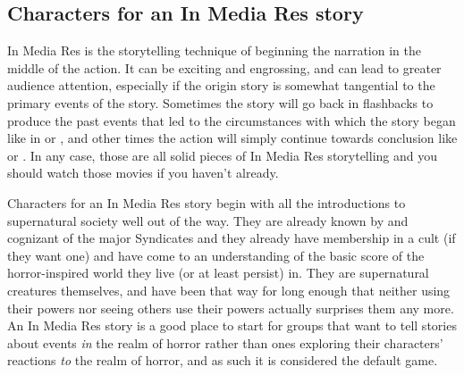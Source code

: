 \subsection[In Media Res]{Characters for an In Media Res story}

In Media Res is the storytelling technique of beginning the narration in the middle of the action. It can be exciting and engrossing, and can lead to greater audience attention, especially if the origin story is somewhat tangential to the primary events of the story. Sometimes the story will go back in flashbacks to produce the past events that led to the circumstances with which the story began like in  or , and other times the action will simply continue towards conclusion like  or . In any case, those are all solid pieces of In Media Res storytelling and you should watch those movies if you haven't already.

Characters for an In Media Res story begin with all the introductions to supernatural society well out of the way. They are already known by and cognizant of the major Syndicates and they already have membership in a cult (if they want one) and have come to an understanding of the basic score of the horror-inspired world they live (or at least persist) in. They are supernatural creatures themselves, and have been that way for long enough that neither using their powers nor seeing others use their powers actually surprises them any more. An In Media Res story is a good place to start for groups that want to tell stories about events \textit{in} the realm of horror rather than ones exploring their characters' reactions \textit{to} the realm of horror, and as such it is considered the default game.

